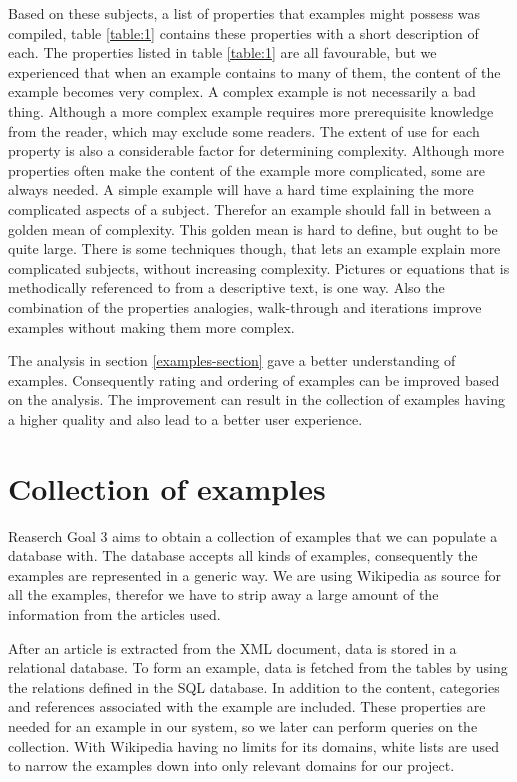 Based on these subjects, a list of properties that examples might possess was compiled, table \ref{table:1} contains these properties with a short description of each. The properties listed in table \ref{table:1} are all favourable, but we experienced that when an example contains to many of them, the content of the example becomes very complex. A complex example is not necessarily a bad thing. Although a more complex example requires more prerequisite knowledge from the reader, which may exclude some readers. The extent of use for each property is also a considerable factor for determining complexity. Although more properties often make the content of the example more complicated, some are always needed. A simple example will have a hard time explaining the more complicated aspects of a subject. Therefor an example should fall in between a golden mean of complexity. This golden mean is hard to define, but ought to be quite large. There is some techniques though, that lets an example explain more complicated subjects, without increasing complexity. Pictures or equations that is methodically referenced to from a descriptive text, is one way. Also the combination of the properties analogies, walk-through and iterations improve examples without making them more complex. 

The analysis in section \ref{examples-section} gave a better understanding of examples. Consequently rating and ordering of examples can be improved based on the analysis. 
The improvement can result in the collection of examples having a higher quality and also lead to a better user experience. 


\section{Collection of examples}
Reaserch Goal 3 aims to obtain a collection of examples that we can populate a database with. The database accepts all kinds of examples, consequently the examples are represented in a generic way. We are using Wikipedia as source for all the examples, therefor we have to strip away a large amount of the information from the articles used. 

After an article is extracted from the XML document, data is stored in a relational database. To form an example, data is fetched from the tables by using the relations defined in the SQL database. In addition to the content, categories and references associated with the example are included. These properties are needed for an example in our system, so we later can perform queries on the collection. With Wikipedia having no limits for its domains, white lists are used to narrow the examples down into only relevant domains for our project.

